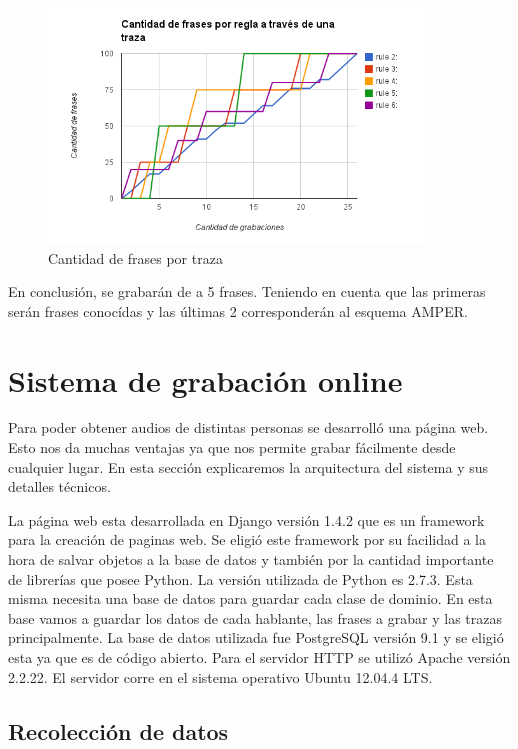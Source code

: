 \documentclass[11pt,a4paper,twoside]{tesis}
\begin{document}

\begin{figure}[h!]
    \centerline{\includegraphics[width=0.9\textwidth]{cant_frases_traza_inf} }
    \caption{Cantidad de frases por traza}
    \label{figFracesTraza}
\end{figure}

En conclusión, se grabarán de a 5 frases. Teniendo en cuenta que las primeras serán frases conocídas y las últimas 2 corresponderán al esquema AMPER. 

\chapter{Sistema de grabación online}

Para poder obtener audios de distintas personas se desarrolló una página web. Esto nos da muchas ventajas ya que nos permite grabar fácilmente desde cualquier lugar. En esta sección explicaremos la arquitectura del sistema y sus detalles técnicos.

La página web esta desarrollada en Django versión 1.4.2 que es un framework para la creación de paginas web. Se eligió este framework por su facilidad a la hora de salvar objetos a la base de datos y también por la cantidad importante de librerías que posee Python. La versión utilizada de Python es 2.7.3. Esta misma necesita una base de datos para guardar cada clase de dominio. En esta base vamos a guardar los datos de cada hablante, las frases a grabar y las trazas principalmente. La base de datos utilizada fue PostgreSQL versión 9.1 y se eligió esta ya que es de código abierto. Para el servidor HTTP se utilizó Apache versión 2.2.22. El servidor corre en el sistema operativo Ubuntu 12.04.4 LTS.

\section{Recolección de datos}
\end{document}
